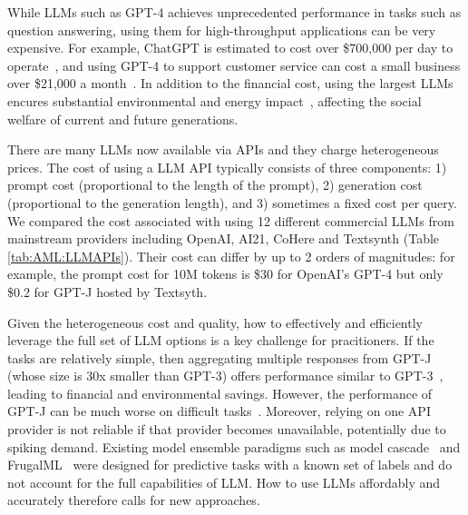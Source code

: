 \documentclass{article}
\numberwithin{equation}{section}
\begin{document}
While LLMs such as GPT-4 achieves unprecedented performance in tasks such as question answering, using them for high-throughput applications can be very expensive. For example, ChatGPT is estimated to cost over \$700,000 per day to operate~\cite{CostEstChatGPT}, and using GPT-4 to support customer service can cost a small business over \$21,000 a month~\cite{CostEstGPT3}. In addition to the financial cost, using the largest LLMs encures substantial environmental and energy impact~\cite{bender2021dangers,wu2022sustainable}, affecting the social welfare of current and future generations. 


There are many LLMs now available via APIs and they charge heterogeneous prices. 
The cost of using a LLM API typically 
 consists of three components: 1) prompt cost (proportional to the length of the prompt), 2) generation cost (proportional to the generation length), and 3) sometimes a fixed cost per query. We  compared the cost associated with using 12 different commercial LLMs from mainstream providers including OpenAI, AI21, CoHere and Textsynth (Table \ref{tab:AML:LLMAPIs}). Their cost can differ by up to 2 orders of magnitudes: for example,  the prompt cost for 10M tokens is \$30 for OpenAI's GPT-4 but only \$0.2 for GPT-J hosted by Textsyth.

Given the heterogeneous cost and quality, how to effectively and efficiently leverage the full set of LLM options is a key challenge for pracitioners. 
If the tasks are relatively simple, then aggregating multiple responses from GPT-J~\cite{wang2021gpt} (whose size is 30x smaller than GPT-3) offers performance similar to GPT-3~\cite{arora2022ask}, leading to financial and environmental savings.
However, the  performance of GPT-J can be much worse on difficult tasks~\cite{touvron2023llama}. Moreover, relying on one API provider is not reliable if that provider becomes unavailable, potentially due to spiking demand.
Existing model ensemble paradigms such as model cascade~\cite{viola2004robust,wang2011cascade} and  FrugalML~\cite{chen2020frugalml,chen2022efficient} were designed for predictive tasks with a known set of labels and do not account for the full capabilities of LLM.
How to use LLMs affordably and accurately therefore calls for new approaches.
\end{document}
